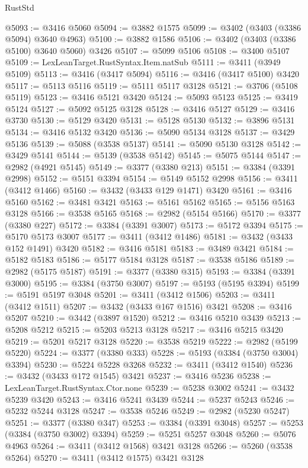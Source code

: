 \begin{lexlean}{RustStd}
\begin{coremodule}
@5093 := @3416 @5060
@5094 := @3882 @1575
@5099 := @3402 (@3403 (@3386 @5094) @3640 @4963)
@5100 := @3882 @1586
@5106 := @3402 (@3403 (@3386 @5100) @3640 @5060) @3426
@5107 := @5099 @5106
@5108 := @3400 @5107
@5109 := LexLeanTarget.RustSyntax.Item.natSub
@5111 := @3411 (@3949 @5109)
@5113 := @3416 (@3417 @5094)
@5116 := @3416 (@3417 @5100) @3420
@5117 := @5113 @5116
@5119 := @5111 @5117 @3128
@5121 := @3706 (@5108 @5119)
@5123 := @3416 @5121 @3420
@5124 := @5093 @5123
@5125 := @3419 @5124
@5127 := @5092 @5125 @3128
@5128 := @3416 @5127
@5129 := @3416 @3730
@5130 := @5129 @3420
@5131 := @5128 @5130
@5132 := @3896 @5131
@5134 := @3416 @5132 @3420
@5136 := @5090 @5134 @3128
@5137 := @3429 @5136
@5139 := @5088 (@3538 @5137)
@5141 := @5090 @5130 @3128
@5142 := @3429 @5141
@5144 := @5139 (@3538 @5142)
@5145 := @5075 @5144
@5147 := @2982 (@4921 @5145)
@5149 := @3377 (@3380 @213)
@5151 := @3384 (@3391 @2998)
@5152 := @5151 @3394
@5154 := @5149 @5152 @2998
@5156 := @3411 (@3412 @1466)
@5160 := @3432 (@3433 @129 @1471) @3420
@5161 := @3416 @5160
@5162 := @3481 @3421
@5163 := @5161 @5162
@5165 := @5156 @5163 @3128
@5166 := @3538 @5165
@5168 := @2982 (@5154 @5166)
@5170 := @3377 (@3380 @227)
@5172 := @3384 (@3391 @3007)
@5173 := @5172 @3394
@5175 := @5170 @5173 @3007
@5177 := @3411 (@3412 @1486)
@5181 := @3432 (@3433 @152 @1491) @3420
@5182 := @3416 @5181
@5183 := @3489 @3421
@5184 := @5182 @5183
@5186 := @5177 @5184 @3128
@5187 := @3538 @5186
@5189 := @2982 (@5175 @5187)
@5191 := @3377 (@3380 @315)
@5193 := @3384 (@3391 @3000)
@5195 := @3384 (@3750 @3007)
@5197 := @5193 (@5195 @3394)
@5199 := @5191 @5197 @3048
@5201 := @3411 (@3412 @1506)
@5203 := @3411 (@3412 @1511)
@5207 := @3432 (@3433 @167 @1516) @3421
@5208 := @3416 @5207
@5210 := @3442 (@3897 @1520)
@5212 := @3416 @5210 @3439
@5213 := @5208 @5212
@5215 := @5203 @5213 @3128
@5217 := @3416 @5215 @3420
@5219 := @5201 @5217 @3128
@5220 := @3538 @5219
@5222 := @2982 (@5199 @5220)
@5224 := @3377 (@3380 @333)
@5228 := @5193 (@3384 (@3750 @3004) @3394)
@5230 := @5224 @5228 @3268
@5232 := @3411 (@3412 @1540)
@5236 := @3432 (@3433 @172 @1545) @3421
@5237 := @3416 @5236
@5238 := LexLeanTarget.RustSyntax.Ctor.none
@5239 := @5238 @3002
@5241 := @3432 @5239 @3420
@5243 := @3416 @5241 @3439
@5244 := @5237 @5243
@5246 := @5232 @5244 @3128
@5247 := @3538 @5246
@5249 := @2982 (@5230 @5247)
@5251 := @3377 (@3380 @347)
@5253 := @3384 (@3391 @3048)
@5257 := @5253 (@3384 (@3750 @3002) @3394)
@5259 := @5251 @5257 @3048
@5260 := @5076 @4963
@5264 := @3411 (@3412 @1568) @3421 @3128
@5266 := @5260 (@3538 @5264)
@5270 := @3411 (@3412 @1575) @3421 @3128

\end{coremodule}
\end{lexlean}
